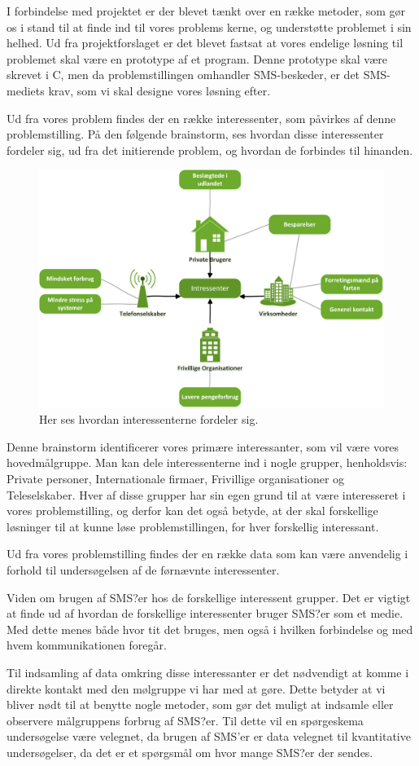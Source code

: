 I forbindelse med projektet er der blevet tænkt over en række metoder, som gør os i stand til at finde ind til vores problems kerne, og understøtte problemet i sin helhed.
Ud fra projektforslaget er det blevet fastsat at vores endelige løsning til problemet skal være en prototype af et program. Denne prototype skal være skrevet i C, men da problemstillingen omhandler SMS-beskeder, er det  SMS-mediets krav, som vi skal designe vores løsning efter.


Ud fra vores problem findes der en række interessenter, som påvirkes af denne problemstilling.
På den følgende brainstorm, ses hvordan disse interessenter fordeler sig, ud fra det initierende problem, og hvordan de forbindes til hinanden.

\begin{figure}[H]
\includegraphics[width=\linewidth]{Billeder/Brainstormting.png}
\caption{Her ses hvordan interessenterne fordeler sig.}
\end{figure}

Denne brainstorm identificerer vores primære interessanter, som vil være vores hovedmålgruppe.
Man kan dele interessenterne ind i nogle grupper, henholdsvis: Private personer, Internationale firmaer, Frivillige organisationer og Teleselskaber.
Hver af disse grupper har sin egen grund til at være interesseret i vores problemstilling, og derfor kan det også betyde, at der skal forskellige løsninger til at kunne løse problemstillingen, for hver forskellig interessant.


Ud fra vores problemstilling findes der en række data som kan være anvendelig i forhold til undersøgelsen af de førnævnte interessenter.


Viden om brugen af SMS?er hos de forskellige interessent grupper.
Det er vigtigt at finde ud af hvordan de forskellige interessenter bruger SMS?er som et medie. Med dette menes både hvor tit det bruges, men også i hvilken forbindelse og med hvem kommunikationen foregår.


Til indsamling af data omkring disse interessanter er det nødvendigt at komme i direkte kontakt med den mølgruppe vi har med at gøre. Dette betyder at vi bliver nødt til at benytte nogle metoder, som gør det muligt at indsamle eller observere målgruppens forbrug af SMS?er.
Til dette vil en spørgeskema undersøgelse være velegnet, da brugen af SMS'er er data velegnet til kvantitative undersøgelser, da det er et spørgsmål om hvor mange SMS?er der sendes.